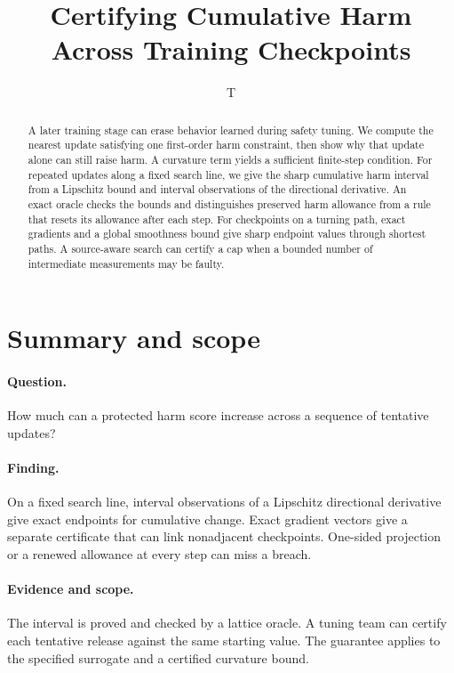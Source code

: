 \documentclass[11pt]{article}
\title{Certifying Cumulative Harm Across Training Checkpoints}
\author{T}
\date{}
\begin{document}
\maketitle

\begin{abstract}
A later training stage can erase behavior learned during safety
tuning. We compute the nearest update satisfying one first-order
harm constraint, then show why that update alone can still raise
harm. A curvature term yields a sufficient finite-step condition.
For repeated updates along a fixed search line, we give the
sharp cumulative harm interval from a Lipschitz bound and
interval observations of the directional derivative. An exact
oracle checks the bounds and distinguishes preserved harm
allowance from a rule that resets its allowance after each step.
For checkpoints on a turning path, exact gradients and a global
smoothness bound give sharp endpoint values through shortest paths.
A source-aware search can certify a cap when a bounded number of
intermediate measurements may be faulty.
\end{abstract}

\section*{Summary and scope}
\paragraph{Question.} How much can a protected harm score increase across
a sequence of tentative updates?
\paragraph{Finding.} On a fixed search line, interval observations of a
Lipschitz directional derivative give exact endpoints for cumulative
change. Exact gradient vectors give a separate certificate that can
link nonadjacent checkpoints. One-sided projection or a renewed
allowance at every step can miss a breach.
\paragraph{Evidence and scope.} The interval is proved and
checked by a lattice oracle. A tuning team can certify each tentative
release against the same starting value. The guarantee applies to the
specified surrogate and a certified curvature bound.
\end{document}
